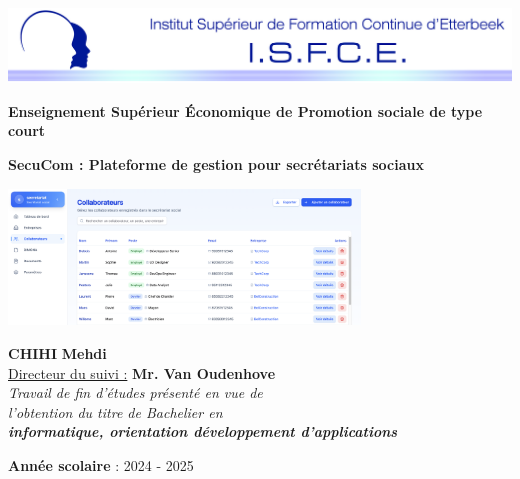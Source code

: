 \thispagestyle{empty}

\begin{center}
    \includegraphics[width=1\textwidth]{ISFCE_EnteteTFE.jpg}
\end{center}

\begin{center}
    \large\textbf{Enseignement Supérieur Économique de Promotion sociale de type court}
\end{center}

\vspace{2cm}

\begin{center}
    \huge\textbf{SecuCom : Plateforme de gestion pour secrétariats sociaux}
\end{center}

\vspace{0.5cm}

\begin{center}
    \includegraphics[width=0.7\textwidth]{SecuComPreview.png}
\end{center}

\vspace{2cm}

\begin{flushright}
    \large
    \textbf{CHIHI} \textbf{Mehdi}\\
    \vspace{0.3cm}
    \underline{Directeur du suivi :}  \textbf{Mr. Van Oudenhove}\\
    \vspace{0.3cm}
    \textit{Travail de fin d'études présenté en vue de\\
    l'obtention du titre de Bachelier en\\
    \textbf{informatique, orientation développement d'applications}}
\end{flushright}

\begin{flushleft}
    \large
    \textbf{Année scolaire} : 2024 - 2025
\end{flushleft}
